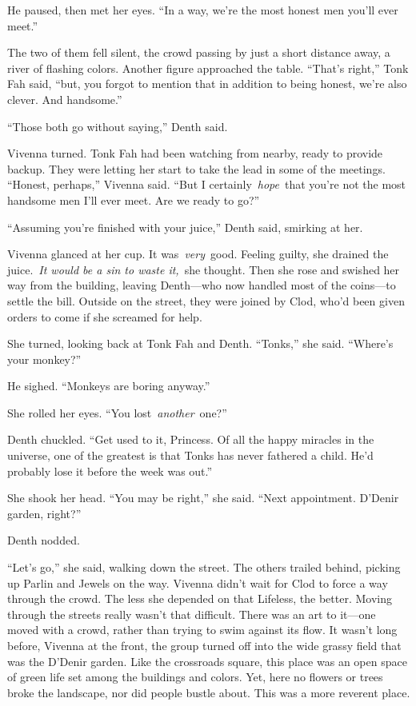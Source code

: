 He paused, then met her eyes. “In a way, we’re the most honest men you’ll ever meet.”

The two of them fell silent, the crowd passing by just a short distance away, a river of flashing colors. Another figure approached the table. “That’s right,” Tonk Fah said, “but, you forgot to mention that in addition to being honest, we’re also clever. And handsome.”

“Those both go without saying,” Denth said.

Vivenna turned. Tonk Fah had been watching from nearby, ready to provide backup. They were letting her start to take the lead in some of the meetings. “Honest, perhaps,” Vivenna said. “But I certainly~\textit{hope}~that you’re not the most handsome men I’ll ever meet. Are we ready to go?”

“Assuming you’re finished with your juice,” Denth said, smirking at her.

Vivenna glanced at her cup. It was~\textit{very}~good. Feeling guilty, she drained the juice.~\textit{It would be a sin to waste it,}~she thought. Then she rose and swished her way from the building, leaving Denth—who now handled most of the coins—to settle the bill. Outside on the street, they were joined by Clod, who’d been given orders to come if she screamed for help.

She turned, looking back at Tonk Fah and Denth. “Tonks,” she said. “Where’s your monkey?”

He sighed. “Monkeys are boring anyway.”

She rolled her eyes. “You lost~\textit{another}~one?”

Denth chuckled. “Get used to it, Princess. Of all the happy miracles in the universe, one of the greatest is that Tonks has never fathered a child. He’d probably lose it before the week was out.”

She shook her head. “You may be right,” she said. “Next appointment. D’Denir garden, right?”

Denth nodded.

“Let’s go,” she said, walking down the street. The others trailed behind, picking up Parlin and Jewels on the way. Vivenna didn’t wait for Clod to force a way through the crowd. The less she depended on that Lifeless, the better. Moving through the streets really wasn’t that difficult. There was an art to it—one moved with a crowd, rather than trying to swim against its flow. It wasn’t long before, Vivenna at the front, the group turned off into the wide grassy field that was the D’Denir garden. Like the crossroads square, this place was an open space of green life set among the buildings and colors. Yet, here no flowers or trees broke the landscape, nor did people bustle about. This was a more reverent place.

